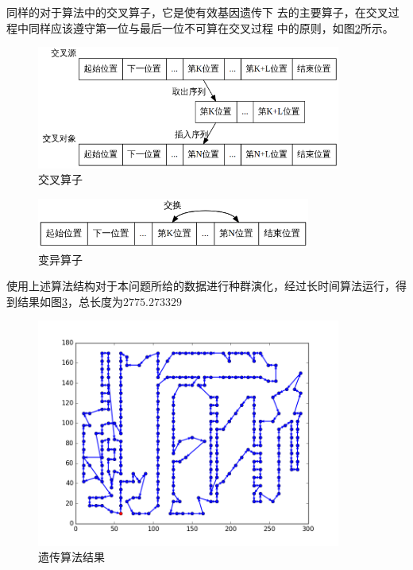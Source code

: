 \documentclass[fontset=windows,a4paper,12pt]{ctexart}
\begin{document}
        同样的对于算法中的交叉算子，它是使有效基因遗传下
        去的主要算子，在交叉过程中同样应该遵守第一位与最后一位不可算在交叉过程
        中的原则，如图\ref{fig:muate}所示。
        
		\begin{figure}[htbp]
			\centering
			\includegraphics[width=10cm]{pic/life_cross.png}
			\caption{交叉算子}
			\label{fig:cross}
		\end{figure}
		\begin{figure}[htbp]
			\centering
			\includegraphics[width=9cm]{pic/life_muate.png}
			\caption{变异算子}
			\label{fig:muate}
		\end{figure}
        使用上述算法结构对于本问题所给的数据进行种群演化，经过长时间算法运行，得到结果如图\ref{fig:ga}，总长度为$2775.273329$
        \begin{figure}[!htbp]
        	\centering
        	\includegraphics[width=10cm]{pic/ga_result.png}
        	\caption{遗传算法结果}
        	\label{fig:ga}
        \end{figure}
\end{document}
